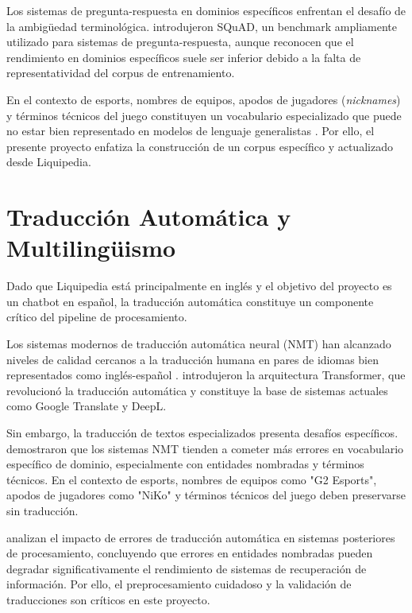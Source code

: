 Los sistemas de pregunta-respuesta en dominios específicos enfrentan el desafío de la ambigüedad terminológica. \cite{rajpurkar2016squad} introdujeron SQuAD, un benchmark ampliamente utilizado para sistemas de pregunta-respuesta, aunque reconocen que el rendimiento en dominios específicos suele ser inferior debido a la falta de representatividad del corpus de entrenamiento.

En el contexto de esports, nombres de equipos, apodos de jugadores (\textit{nicknames}) y términos técnicos del juego constituyen un vocabulario especializado que puede no estar bien representado en modelos de lenguaje generalistas \cite{esports2021nlp}. Por ello, el presente proyecto enfatiza la construcción de un corpus específico y actualizado desde Liquipedia.

\section{Traducción Automática y Multilingüismo}

Dado que Liquipedia está principalmente en inglés y el objetivo del proyecto es un chatbot en español, la traducción automática constituye un componente crítico del pipeline de procesamiento.

Los sistemas modernos de traducción automática neural (NMT) han alcanzado niveles de calidad cercanos a la traducción humana en pares de idiomas bien representados como inglés-español \cite{bahdanau2014neural}. \cite{vaswani2017attention} introdujeron la arquitectura Transformer, que revolucionó la traducción automática y constituye la base de sistemas actuales como Google Translate y DeepL.

Sin embargo, la traducción de textos especializados presenta desafíos específicos. \cite{bentivogli2016neural} demostraron que los sistemas NMT tienden a cometer más errores en vocabulario específico de dominio, especialmente con entidades nombradas y términos técnicos. En el contexto de esports, nombres de equipos como "G2 Esports", apodos de jugadores como "NiKo" y términos técnicos del juego deben preservarse sin traducción.

\cite{doherty2012translation} analizan el impacto de errores de traducción automática en sistemas posteriores de procesamiento, concluyendo que errores en entidades nombradas pueden degradar significativamente el rendimiento de sistemas de recuperación de información. Por ello, el preprocesamiento cuidadoso y la validación de traducciones son críticos en este proyecto.

